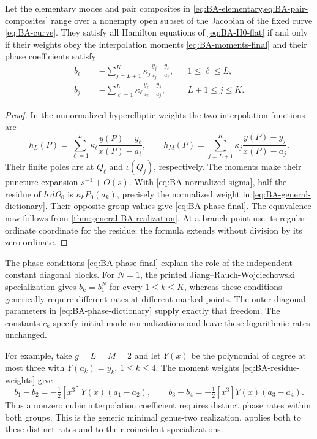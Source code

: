 \begin{corollary}\label{cor:BA-realization}
Let the elementary modes and pair composites in
\cref{eq:BA-elementary,eq:BA-pair-composites} range over a nonempty
open subset of the Jacobian of the fixed curve
\cref{eq:BA-curve}. They satisfy all Hamilton equations of
\cref{eq:BA-H0-flat} if and only if their weights obey the interpolation
moments \cref{eq:BA-moments-final} and their phase coefficients satisfy
\begin{equation}\label{eq:BA-phase-final}
\begin{aligned}
 b_{\ell}
 &=-\sum_{j=L+1}^{K}\kappa_j
       \frac{y_j-y_{\ell}}{a_j-a_{\ell}},&&1\leq\ell\leq L,\\
 b_j
 &=-\sum_{\ell=1}^{L}\kappa_{\ell}
       \frac{y_{\ell}-y_j}{a_{\ell}-a_j},&&L+1\leq j\leq K.
\end{aligned}
\end{equation}
\end{corollary}
\begin{proof}
In the unnormalized hyperelliptic weights the two interpolation
functions are
\begin{equation}\label{eq:BA-hyperelliptic-h}
 h_L(P)=\sum_{\ell=1}^{L}\kappa_{\ell}\frac{y(P)+y_{\ell}}{x(P)-a_{\ell}},\qquad
 h_M(P)=\sum_{j=L+1}^{K}\kappa_j\frac{y(P)-y_j}{x(P)-a_j}.
\end{equation}
Their finite poles are at $Q_{\ell}$ and $\iota(Q_j)$, respectively.
The moments make their puncture expansion $s^{-1}+O(s)$.
With \cref{eq:BA-normalized-sigma}, half the residue of
$h\,d\Omega_0$ is $\kappa_kP_0(a_k)$, precisely the normalized
weight in \cref{eq:BA-general-dictionary}.
Their opposite-group values give \cref{eq:BA-phase-final}.
The equivalence now follows from \cref{thm:general-BA-realization}.
At a branch point use its regular ordinate coordinate for the residue;
the formula extends without division by its zero ordinate.
\end{proof}

The phase conditions \cref{eq:BA-phase-final} explain the role of the
independent constant diagonal blocks. For $N=1$, the printed
Jiang--Rauch-Wojciechowski specialization gives
$b_k=b_1^N$ for every $1\leq k\leq K$, whereas these conditions
generically require different rates at different marked points.
The outer diagonal parameters in \cref{eq:BA-phase-dictionary}
supply exactly that freedom. The constants $c_k$ specify initial mode
normalizations and leave these logarithmic rates unchanged.

For example, take $g=L=M=2$ and let $Y(x)$ be the polynomial of degree
at most three with $Y(a_k)=y_k$, $1\leq k\leq4$. The moment weights
\cref{eq:BA-residue-weights} give
\begin{equation}\label{eq:BA-phase-differences}
 b_1-b_2=-\tfrac12[x^3]Y(x)(a_1-a_2),\qquad
 b_3-b_4=-\tfrac12[x^3]Y(x)(a_3-a_4).
\end{equation}
Thus a nonzero cubic interpolation coefficient requires distinct
phase rates within both groups. This is the generic minimal genus-two
realization.  applies both to these
distinct rates and to their coincident specializations.

